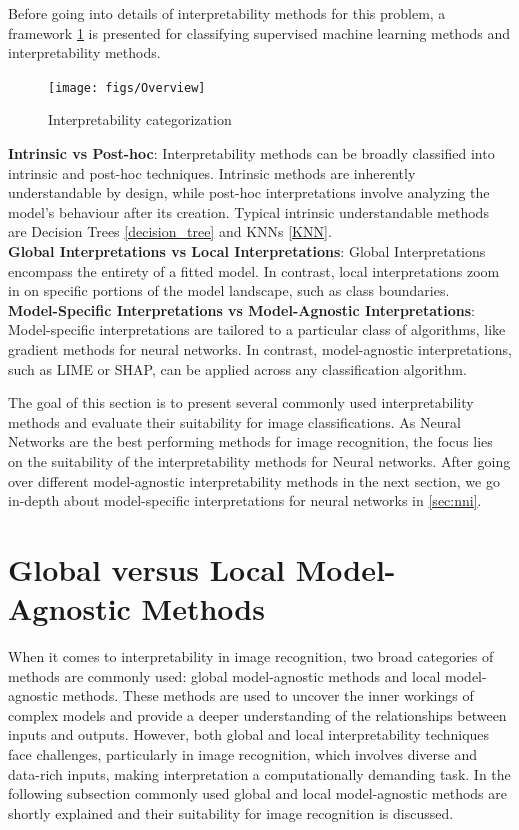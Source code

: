 Before going into details of interpretability methods for this problem, a framework \ref{fig:IML_Overview} is presented \cite{allen2023interpretable} for classifying supervised machine learning methods and interpretability methods.

\begin{figure}[h!]
	\centering
	\texttt{[image: figs/Overview]}
	\caption[Interpretability categorization \cite{allen2023interpretable}]{Interpretability categorization}
	\label{fig:IML_Overview}
\end{figure}

\textbf{Intrinsic vs Post-hoc}: Interpretability methods can be broadly classified into intrinsic and post-hoc techniques. Intrinsic methods are inherently understandable by design, while post-hoc interpretations involve analyzing the model's behaviour after its creation. Typical intrinsic understandable methods are Decision Trees \ref{decision_tree} and KNNs \ref{KNN}. 
\\
\textbf{Global Interpretations vs Local Interpretations}: Global Interpretations encompass the entirety of a fitted model. In contrast, local interpretations zoom in on specific portions of the model landscape, such as class boundaries.
\\
\textbf{Model-Specific Interpretations vs Model-Agnostic Interpretations}: 
Model-specific interpretations are tailored to a particular class of algorithms, like gradient methods for neural networks. In contrast, model-agnostic interpretations, such as LIME or SHAP, can be applied across any classification algorithm.

The goal of this section is to present several commonly used interpretability methods and evaluate their suitability for image classifications. As Neural Networks are the best performing methods for image recognition, the focus lies on the suitability of the interpretability methods for Neural networks. After going over different model-agnostic interpretability methods in the next section, we go in-depth about model-specific interpretations for neural networks in \ref{sec:nni}. 


\section{Global versus Local Model-Agnostic Methods}

When it comes to interpretability in image recognition, two broad categories of methods are commonly used: global model-agnostic methods and local model-agnostic methods. These methods are used to uncover the inner workings of complex models and provide a deeper understanding of the relationships between inputs and outputs. However, both global and local interpretability techniques face challenges, particularly in image recognition, which involves diverse and data-rich inputs, making interpretation a computationally demanding task. In the following subsection commonly used global and local model-agnostic methods are shortly explained and their suitability for image recognition is discussed.

